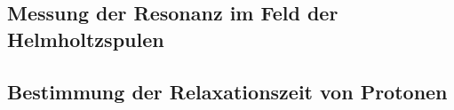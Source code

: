 \documentclass[paper=a4,
	fontsize=10pt,
	DIV=18,
	twocolumn,
	parskip=half
	]{scrartcl}
\numberwithin{equation}{section}    %
\newcommand{\tra}{$\rightarrow$}
\begin{document}
\subsection{Messung der Resonanz im Feld der Helmholtzspulen}
\label{auswertung6}

\subsection{Bestimmung der Relaxationszeit von Protonen}
\label{auswertung7}
\end{document}
